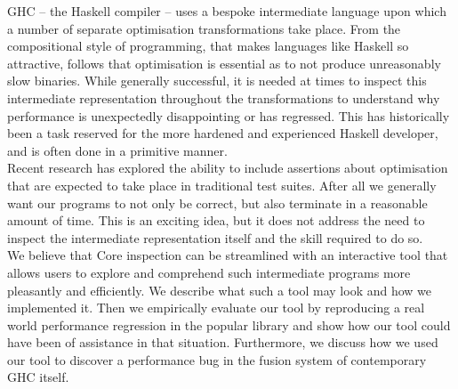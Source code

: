 GHC -- the Haskell compiler -- uses a bespoke intermediate language upon which a number of separate optimisation transformations take place.
From the compositional style of programming, that makes languages like Haskell so attractive, follows that optimisation is essential as to not produce
unreasonably slow binaries.
While generally successful, it is needed at times to inspect this intermediate representation throughout the transformations to understand
why performance is unexpectedly disappointing or has regressed. This has historically been a task reserved for the more hardened and experienced
Haskell developer, and is often done in a primitive manner.
\\

Recent research has explored the ability to include assertions about optimisation that are expected to take place in traditional test suites.
After all we generally want our programs to not only be correct, but also terminate in a reasonable amount of time.
This is an exciting idea, but it does not address the need to inspect the intermediate representation itself and the skill required to do so.
\\

We believe that Core inspection can be streamlined with an interactive tool that allows users to explore and comprehend such
intermediate programs more pleasantly and efficiently. We describe what such a tool may look and how we implemented it. Then we
empirically evaluate our tool by reproducing a real world performance regression in the popular  library and show how our tool
could have been of assistance in that situation. Furthermore, we discuss how we used our tool to discover a performance bug in the fusion  
system of contemporary GHC itself.
